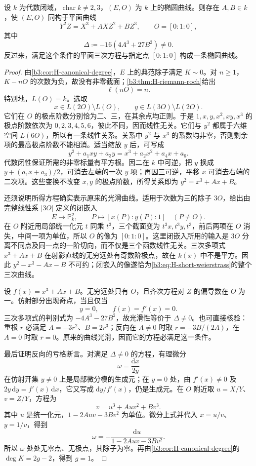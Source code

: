 \begin{theorem}[Weierstrass 模型]\label{b3:thm:H-weierstrass-model}
	设 \(k\) 为代数闭域，\(\operatorname{char}k\ne2,3\)，\((E,O)\) 为 \(k\) 上的椭圆曲线。则存在 \(A,B\in k\)，使 \((E,O)\) 同构于平面曲线
	\begin{equation}\label{b3:eq:H-short-weierstrass}
		Y^2Z=X^3+AXZ^2+BZ^3,\qquad O=[0:1:0],
	\end{equation}
	其中
	\[
		\Delta\coloneqq-16(4A^3+27B^2)\ne0.
	\]
	反过来，满足这个条件的平面三次方程与指定点 \([0:1:0]\) 构成一条椭圆曲线。
\end{theorem}
\begin{proof}
	由\cref{b3:cor:H-canonical-degree}，\(E\) 上的典范除子满足 \(K\sim0\)。对 \(n\ge1\)，\(K-nO\) 的次数为负，故没有非零截面；\cref{b3:thm:H-riemann-roch}给出
	\[
		\ell(nO)=n.
	\]
	特别地，\(L(O)=k\)。选取
	\[
		x\in L(2O)\setminus L(O),\qquad
		y\in L(3O)\setminus L(2O).
	\]
	它们在 \(O\) 的极点阶数分别恰为二、三，在其余点均正则。于是 \(1,x,y,x^2,xy,x^3\) 的极点阶数依次为 \(0,2,3,4,5,6\)，彼此不同，因而线性无关。它们与 \(y^2\) 都属于六维空间 \(L(6O)\)，所以有一条线性关系。关系中 \(y^2\) 与 \(x^3\) 的系数均非零，否则剩余项的最高极点阶数不能相消。适当缩放 \(y\) 后，可写成
	\[
		y^2+a_1xy+a_3y=x^3+a_2x^2+a_4x+a_6.
	\]
	代数闭性保证所需的非零标量有平方根。因二在 \(k\) 中可逆，把 \(y\) 换成 \(y+(a_1x+a_3)/2\)，可消去左端的一次 \(y\) 项；再因三可逆，平移 \(x\) 可消去右端的二次项。这些变换不改变 \(x,y\) 的极点阶数，所得关系即为 \(y^2=x^3+Ax+B\)。

	还须说明所得方程确实表示原来的光滑曲线。适用于次数为三的除子 \(3O\)，给出由完整线性系 \(|3O|\) 定义的闭嵌入
	\[
		E\longrightarrow\mathbb P^2_k,
		\qquad P\longmapsto[x(P):y(P):1]\quad(P\ne O).
	\]
	在 \(O\) 附近用局部统一化元 \(t\) 同乘 \(t^3\)，三个截面变为 \(t^3x,t^3y,t^3\)，前后两项在 \(O\) 消失，中间一项为单位，所以 \(O\) 的像为 \([0:1:0]\)。这里闭嵌入所用的输入是 \(3O\) 分离不同点及同一点的一阶切向，而不仅是三个函数线性无关。三次多项式 \(x^3+Ax+B\) 在射影直线的无穷远处有奇数阶极点，故在 \(k(x)\) 中不是平方。因此 \(y^2-x^3-Ax-B\) 不可约；闭嵌入的像遂恰为\eqref{b3:eq:H-short-weierstrass}的整个三次曲线。

	设 \(f(x)=x^3+Ax+B\)。无穷远处只有 \(O\)，且齐次方程对 \(Z\) 的偏导数在 \(O\) 为一。仿射部分出现奇点，当且仅当
	\[
		y=0,\qquad f(x)=f'(x)=0.
	\]
	三次多项式的判别式为 \(-4A^3-27B^2\)，故光滑性等价于 \(\Delta\ne0\)。也可直接核验：重根 \(r\) 必满足 \(A=-3r^2\)、\(B=2r^3\)；反向在 \(A\ne0\) 时取 \(r=-3B/(2A)\)，在 \(A=0\) 时取 \(r=0\)。原来的曲线光滑，因而它的方程必满足这一条件。

	最后证明反向的亏格断言。对满足 \(\Delta\ne0\) 的方程，有理微分
	\[
		\omega=\frac{\mathrm{d}x}{2y}
	\]
	在仿射开集 \(y\ne0\) 上是局部微分模的生成元；在 \(y=0\) 处，由 \(f'(x)\ne0\) 及 \(2y\,\mathrm{d}y=f'(x)\,\mathrm{d}x\)，它又写成 \(\mathrm{d}y/f'(x)\)，仍是生成元。在 \(O\) 附近取 \(u=X/Y\)、\(v=Z/Y\)，方程为
	\[
		v=u^3+Auv^2+Bv^3.
	\]
	其中 \(u\) 是统一化元，\(1-2Auv-3Bv^2\) 为单位。微分上式并代入 \(x=u/v\)、\(y=1/v\)，得到
	\[
		\omega=-\frac{\mathrm{d}u}{1-2Auv-3Bv^2}.
	\]
	所以 \(\omega\) 处处无零点、无极点，其除子为零。再由\cref{b3:cor:H-canonical-degree}的 \(\deg K=2g-2\)，得到 \(g=1\)。
\end{proof}

